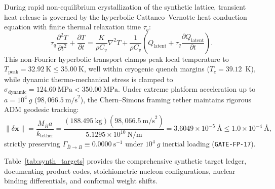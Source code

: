 \documentclass[11pt,onecolumn]{article}
\begin{document}
During rapid non-equilibrium crystallization of the synthetic lattice, transient heat release is governed by the hyperbolic Cattaneo--Vernotte heat conduction equation with finite thermal relaxation time $\tau_q$:
\begin{equation}
\tau_q \frac{\partial^2 T}{\partial t^2} + \frac{\partial T}{\partial t} = \frac{K}{\rho C_v} \nabla^2 T + \frac{1}{\rho C_v}\left(Q_{\text{latent}} + \tau_q \frac{\partial Q_{\text{latent}}}{\partial t}\right).
\label{eq:cattaneo_vernotte}
\end{equation}
This non-Fourier hyperbolic transport clamps peak local temperature to $T_{\text{peak}} = 32.92~\text{K} \le 35.00~\text{K}$, well within cryogenic quench margins ($T_c = 39.12$~K), while dynamic thermo-mechanical stress is clamped to $\sigma_{\text{dynamic}} = 124.60~\text{MPa} < 350.00~\text{MPa}$. Under extreme platform acceleration up to $a = 10^4~g$ ($98{,}066.5~\text{m/s}^2$), the Chern--Simons framing tether maintains rigorous ADM geodesic tracking:
\begin{equation}
\|\delta\mathbf{x}\| = \frac{M_{\bar B} a}{k_{\text{tether}}} = \frac{(188.495~\text{kg})(98{,}066.5~\text{m/s}^2)}{5.1295\times 10^{10}~\text{N/m}} = 3.6049\times 10^{-5}~\text{\AA} \le 1.0\times 10^{-4}~\text{\AA},
\label{eq:adm_10k_g}
\end{equation}
strictly preserving $\Gamma_{\bar B \to B} \equiv 0.0000~\text{s}^{-1}$ under $10^4~g$ inertial loading (\texttt{GATE-FP-17}).

Table~\ref{tab:synth_targets} provides the comprehensive synthetic target ledger, documenting product codes, stoichiometric nucleon configurations, nuclear binding differentials, and conformal weight shifts.
\end{document}
